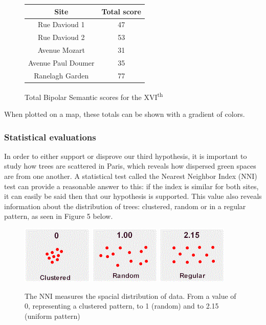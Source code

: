 \documentclass[11pt,letterpaper]{article}
\begin{document}
\begin{figure}
    \begin{center}
        \begin{tabular}{||c c||}
            \hline
            Site & Total score  \\ [0.5ex]
            \hline\hline
            Rue Davioud 1       & 47    \\
            \hline
            Rue Davioud 2       & 53    \\
            \hline
            Avenue Mozart       & 31    \\
            \hline
            Avenue Paul Doumer  & 35    \\
            \hline
            Ranelagh Garden     & 77    \\ [1ex]
            \hline
        \end{tabular}
    \end{center}
    \caption{Total Bipolar Semantic scores for the XVI\textsuperscript{th}}
\end{figure}

When plotted on a map, these totals can be shown with a gradient of colors.



\subsubsection{Statistical evaluations}

In order to either support or disprove our third hypothesis, it is important to study how trees are scattered in Paris, which reveals how dispersed green spaces are from one another. A statistical test called the Nearest Neighbor Index (NNI) test can provide a reasonable answer to this: if the index is similar for both sites, it can easily be said then that our hypothesis is supported. This value also reveals information about the distribution of trees: clustered, random or in a regular pattern, as seen in Figure 5 below.

\begin{figure}[H]
    \centering
    \includegraphics[width=0.2\linewidth]{media/nni1.png}
    \includegraphics[width=0.2\linewidth]{media/nni2.png}
    \includegraphics[width=0.2\linewidth]{media/nni3.png}
    \caption{The NNI measures the spacial distribution of data. From a value of 0, representing a clustered pattern, to 1 (random) and to 2.15 (uniform pattern)}
\end{figure}
\end{document}
